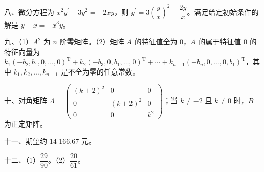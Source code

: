 \documentclass[UTF8,12pt]{ctexart}
\begin{document}
八、微分方程为 \(\displaystyle x^2y^{\prime}-3y^2=-2xy\)，则 \(\displaystyle y^{\prime}=3\left(\dfrac{\displaystyle y}{\displaystyle x}\right)^2-\dfrac{\displaystyle 2y}{\displaystyle x}\)。满足给定初始条件的解是 \(\displaystyle y-x=-x^3y\)。


九、（1）\(\displaystyle A^2\) 为 \(\displaystyle n\) 阶零矩阵。（2）矩阵 \(\displaystyle A\) 的特征值全为 0，\(\displaystyle A\) 的属于特征值 0 的特征向量为 \(\displaystyle k_1(-b_2,\allowbreak b_1,\allowbreak 0,\allowbreak \ldots,\allowbreak 0)^{\mathrm T}+k_2(-b_3,\allowbreak 0,\allowbreak b_1,\allowbreak \ldots,\allowbreak 0)^{\mathrm T}+\cdots+k_{n-1}(-b_n,\allowbreak 0,\allowbreak \ldots,\allowbreak 0,\allowbreak b_1)^{\mathrm T}\)，其中 \(\displaystyle k_1,\allowbreak k_2,\allowbreak \ldots,\allowbreak k_{n-1}\) 是不全为零的任意常数。


十、对角矩阵 \(\displaystyle \Lambda=\begin{pmatrix}(k+2)^2&0&0\\0&(k+2)^2&0\\0&0&k^2\end{pmatrix}\)；当 \(\displaystyle k\ne-2\) 且 \(\displaystyle k\ne0\) 时，\(\displaystyle B\) 为正定矩阵。


十一、期望约 14 166.67 元。


十二、（1）\(\displaystyle \dfrac{\displaystyle 29}{\displaystyle 90}\)。（2）\(\displaystyle \dfrac{\displaystyle 20}{\displaystyle 61}\)。
\end{document}

